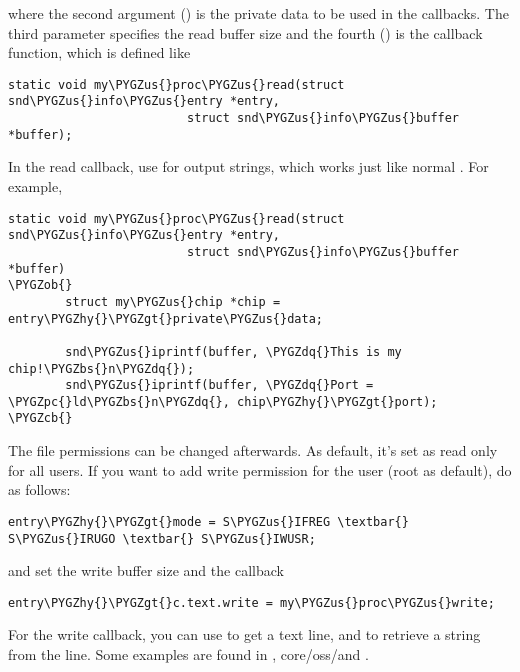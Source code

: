 \documentclass[a4paper,8pt,english]{sphinxmanual}
\def\PYGZbs{\char`\\}
\def\PYGZus{\char`\_}
\def\PYGZob{\char`\{}
\def\PYGZcb{\char`\}}
\def\PYGZgt{\char`\>}
\def\PYGZpc{\char`\%}
\def\PYGZhy{\char`\-}
\def\PYGZdq{\char`\"}
\begin{document}
where the second argument () is the private data to be used in
the callbacks. The third parameter specifies the read buffer size and
the fourth () is the callback function, which is
defined like

\begin{Verbatim}[commandchars=\\\{\}]
static void my\PYGZus{}proc\PYGZus{}read(struct snd\PYGZus{}info\PYGZus{}entry *entry,
                         struct snd\PYGZus{}info\PYGZus{}buffer *buffer);
\end{Verbatim}

In the read callback, use  for output
strings, which works just like normal . For
example,

\begin{Verbatim}[commandchars=\\\{\}]
static void my\PYGZus{}proc\PYGZus{}read(struct snd\PYGZus{}info\PYGZus{}entry *entry,
                         struct snd\PYGZus{}info\PYGZus{}buffer *buffer)
\PYGZob{}
        struct my\PYGZus{}chip *chip = entry\PYGZhy{}\PYGZgt{}private\PYGZus{}data;

        snd\PYGZus{}iprintf(buffer, \PYGZdq{}This is my chip!\PYGZbs{}n\PYGZdq{});
        snd\PYGZus{}iprintf(buffer, \PYGZdq{}Port = \PYGZpc{}ld\PYGZbs{}n\PYGZdq{}, chip\PYGZhy{}\PYGZgt{}port);
\PYGZcb{}
\end{Verbatim}

The file permissions can be changed afterwards. As default, it's set as
read only for all users. If you want to add write permission for the
user (root as default), do as follows:

\begin{Verbatim}[commandchars=\\\{\}]
entry\PYGZhy{}\PYGZgt{}mode = S\PYGZus{}IFREG \textbar{} S\PYGZus{}IRUGO \textbar{} S\PYGZus{}IWUSR;
\end{Verbatim}

and set the write buffer size and the callback

\begin{Verbatim}[commandchars=\\\{\}]
entry\PYGZhy{}\PYGZgt{}c.text.write = my\PYGZus{}proc\PYGZus{}write;
\end{Verbatim}

For the write callback, you can use 
to get a text line, and  to retrieve
a string from the line. Some examples are found in
, core/oss/and .
\end{document}
